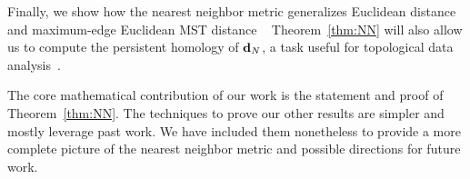 Finally, we show how the nearest neighbor metric generalizes Euclidean
distance and maximum-edge Euclidean MST distance ~\cite{LiWan2001}
Theorem~\ref{thm:NN} will also allow us
to compute the persistent homology of $\mathbf{d}_N$, a task useful for
topological data analysis~\cite{edelsbrunner02topological}.

The core mathematical contribution of our work is the
statement and proof of Theorem~\ref{thm:NN}.  The techniques to prove
our other results are simpler and mostly leverage past work. We have
included them
nonetheless to provide a more complete picture of the nearest neighbor
metric and possible directions for future work.

